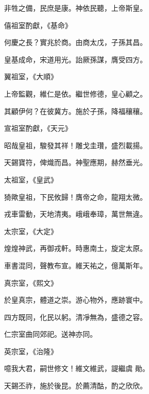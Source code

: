 \begin{pinyinscope}
 非牲之備，民庶是康。神依民聽，上帝斯皇。



 僖祖室酌獻，《基命》



 何慶之長？實兆於商。由商太戊，子孫其昌。



 皇基成命，宋道用光。詒厥孫謀，膺受四方。



 翼祖室，《大順》



 上帝監觀，維仁是依。繼世修德，皇心顧之。



 其顧伊何？在彼冀方。施於子孫，降福穰穰。



 宣祖室酌獻，《天元》



 昭哉皇祖，駿發其祥！雕戈圭瓚，盛烈載揚。



 天錫寶符，俾熾而昌。神聖應期，赫然垂光。



 太祖室，《皇武》



 猗歟皇祖，下民攸歸！膺帝之命，龍翔太微。



 戎車雷動，天地清夷。峨峨奉璋，萬世無違。



 太宗室，《大定》



 煌煌神武，再御戎軒。時惠南土，旋定太原。



 車書混同，聲教布宣。維天祐之，億萬斯年。



 真宗室，《熙文》



 於皇真宗，體道之崇。游心物外，應跡寰中。



 四方既同，化民以躬。清凈無為，盛德之容。



 仁宗室曲同郊祀。送神亦同。



 英宗室，《治隆》



 噫我大君，嗣世修文！維文維武，諟繼虞
 勛。



 天錫丕祚，施於後昆。於薦清酤，酌之欣欣。




\end{pinyinscope}
